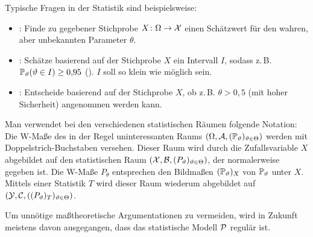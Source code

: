 \begin{Bem}
    Typische Fragen in der Statistik sind beispielsweise:
    \begin{itemize}
        \item
        : Finde zu gegebener Stichprobe $X\colon \Omega \rightarrow \X$
        einen Schätzwert für den wahren, aber unbekannten Parameter $\theta$.

        \item
        : Schätze basierend auf der Stichprobe $X$ ein Intervall $I$,
        sodass z.\,B.
        $\PP_\theta(\theta \in I) \ge 0{,}95$ ().
        $I$ soll so klein wie möglich sein.

        \item
        : Entscheide basierend auf der Stichprobe $X$, ob z.\,B.
        $\theta > 0{,}5$ (mit hoher Sicherheit) angenommen werden kann.
    \end{itemize}
\end{Bem}

\begin{Bem}
    Man verwendet bei den verschiedenen statistischen Räumen folgende Notation:
    Die W-Maße des in der Regel uninteressanten Raums
    $(\Omega, \A, (\PP_\theta)_{\theta \in \Theta})$
    werden mit Doppelstrich-Buchstaben versehen.
    Dieser Raum wird durch die Zufallsvariable $X$ abgebildet auf den statistischen Raum
    $(\X, \B, (P_\theta)_{\theta \in \Theta})$, der normalerweise gegeben ist.
    Die W-Maße $P_\theta$ entsprechen den Bildmaßen
    $(\PP_\theta)_X$ von $\PP_\theta$ unter $X$.
    Mittels einer Statistik $T$ wird dieser Raum wiederum abgebildet auf
    $(\Y, \C, ((P_\theta)_T)_{\theta \in \Theta})$.
\end{Bem}

\linie

\begin{Bem}
    Um unnötige maßtheoretische Argumentationen zu vermeiden, wird in Zukunft meistens davon
    ausgegangen, dass das statistische Modell $\P$ regulär ist.
\end{Bem}

